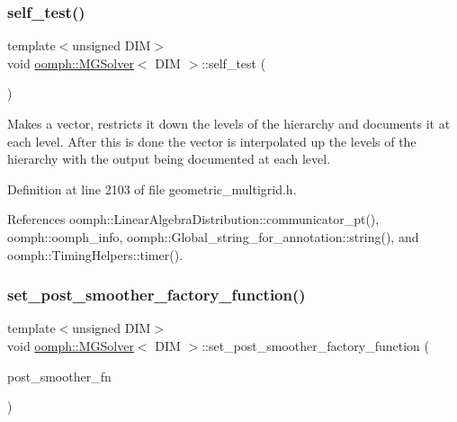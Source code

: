 \subsubsection{\texorpdfstring{self\+\_\+test()}{self\_test()}}
{\footnotesize\ttfamily template$<$unsigned D\+IM$>$ \\
void \hyperlink{classoomph_1_1MGSolver}{oomph\+::\+M\+G\+Solver}$<$ D\+IM $>$\+::self\+\_\+test (\begin{DoxyParamCaption}{ }\end{DoxyParamCaption})}



Makes a vector, restricts it down the levels of the hierarchy and documents it at each level. After this is done the vector is interpolated up the levels of the hierarchy with the output being documented at each level. 



Definition at line 2103 of file geometric\+\_\+multigrid.\+h.



References oomph\+::\+Linear\+Algebra\+Distribution\+::communicator\+\_\+pt(), oomph\+::oomph\+\_\+info, oomph\+::\+Global\+\_\+string\+\_\+for\+\_\+annotation\+::string(), and oomph\+::\+Timing\+Helpers\+::timer().

\mbox{\label{classoomph_1_1MGSolver_a451bf822bb1b42c8cdd8ed3fbb3a7be4}} 
\subsubsection{\texorpdfstring{set\+\_\+post\+\_\+smoother\+\_\+factory\+\_\+function()}{set\_post\_smoother\_factory\_function()}}
{\footnotesize\ttfamily template$<$unsigned D\+IM$>$ \\
void \hyperlink{classoomph_1_1MGSolver}{oomph\+::\+M\+G\+Solver}$<$ D\+IM $>$\+::set\+\_\+post\+\_\+smoother\+\_\+factory\+\_\+function (\begin{DoxyParamCaption}\item[{\hyperlink{classoomph_1_1MGSolver_a72fa4eb80c0b5a0ec6811dcd92b30231}{Post\+Smoother\+Factory\+Fct\+Pt}}]{post\+\_\+smoother\+\_\+fn }\end{DoxyParamCaption})\hspace{0.3cm}{\ttfamily [inline]}}



